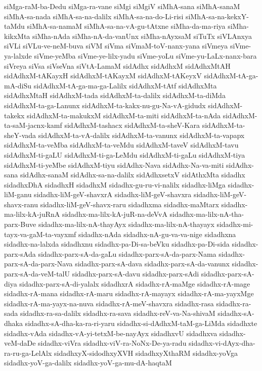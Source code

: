 {siMga-raM-ba-Dedu
siMga-ra-vane
siMgi
siMgiV
siMhA-sana
siMhA-sanaM
siMhA-sa-nada
siMhA-sa-na-dalilx
siMhA-sa-na-do-Li-risi
siMhA-sa-na-kekxY-taMdu
siMhA-sa-namaM
siMhA-sa-na-vA-gu-tAtxne
siMha-da-ma-riya
siMha-kikxMta
siMha-nAda
siMha-nA-da-vanUnx
siMha-nAyxsaM
siTuTx
siVLAnxya
siVLi
siVLu-ve-neM-buva
siVM
siVma
siVmaM-toV-nanx-yana
siVmeya
siVme-ya-lalxde
siVme-yeMba
siVme-ye-lilx-yadu
siVme-yoLu
siVme-yu-LaLx-nanx-bara
siVreya
siVsa
siVseVna
siVtA-LamaM
sidAdhx
sidAdhxM
sidAdhxMtAH
sidAdhxM-tAKayxH
sidAdhxM-tAKayxM
sidAdhxM-tAKeyxV
sidAdhxM-tA-ga-mA-diSu
sidAdhxM-tA-ga-ma-ga-Lalilx
sidAdhxM-tAtf
sidAdhxMta
sidAdhxMtaH
sidAdhxM-tada
sidAdhxM-ta-dalilx
sidAdhxM-ta-diMda
sidAdhxM-ta-ga-Lanunx
sidAdhxM-ta-kakx-nu-gu-Na-vA-gidudx
sidAdhxM-takekx
sidAdhxM-ta-makukxM
sidAdhxM-ta-miti
sidAdhxM-ta-nAda
sidAdhxM-ta-saM-jacnx-kamf
sidAdhxM-tashacx
sidAdhxM-ta-sheV-Kara
sidAdhxM-ta-sheY-vada
sidAdhxM-ta-vA-dalilx
sidAdhxM-ta-vanunx
sidAdhxM-ta-vapapx
sidAdhxM-ta-veMba
sidAdhxM-ta-veMdu
sidAdhxM-taveV
sidAdhxM-tavu
sidAdhxM-ti-gaLU
sidAdhxM-ti-ga-LeMdu
sidAdhxM-ti-gaLu
sidAdhxM-tiya
sidAdhxM-ti-yeMbe
sidAdhxM-tiyu
sidAdhx-Nava
sidAdhx-Na-va-miti
sidAdhx-sana
sidAdhx-sanaM
sidAdhx-sa-na-dalilx
sidAdhxsetxV
sidAthxMta
sidadhx
sidadhxDhA
sidadhxH
sidadhxM
sidadhx-gu-ru-vi-nalilx
sidadhx-liMga
sidadhx-liM-ganu
sidadhx-liM-geV-shavxrA
sidadhx-liM-geV-shavxra
sidadhx-liM-geV-shavx-ranu
sidadhx-liM-geV-shavx-raru
sidadhxma
sidadhx-maMtarx
sidadhx-ma-lilx-kA-juRnA
sidadhx-ma-lilx-kA-juR-na-deVvA
sidadhx-ma-lilx-nA-tha-parx-Buve
sidadhx-ma-lilx-nA-thayAyx
sidadhx-ma-lilx-nA-thayayx
sidadhx-mi-tayx-va-gaM-ta-vayxmf
sidadhx-nAda
sidadhx-nA-gu-va-va-nige
sidadhxna
sidadhx-na-lalxda
sidadhxnu
sidadhx-pa-Di-sa-beVku
sidadhx-pa-Di-sida
sidadhx-parx-sAda
sidadhx-parx-sA-da-gaLu
sidadhx-parx-sA-da-parx-Nama
sidadhx-parx-sA-da-parx-Nava
sidadhx-parx-sA-dava
sidadhx-parx-sA-da-vanunx
sidadhx-parx-sA-da-veM-talU
sidadhx-parx-sA-davu
sidadhx-parx-sAdi
sidadhx-parx-sA-diya
sidadhx-parx-sA-di-yalalx
sidadhxrA
sidadhx-rA-maMge
sidadhx-rA-mage
sidadhx-rA-mana
sidadhx-rA-maru
sidadhx-rA-mayayx
sidadhx-rA-ma-yayxMge
sidadhx-rA-ma-yayx-na-nuva
sidadhx-rA-meV-shavxra
sidadhx-rasa
sidadhx-ra-sada
sidadhx-ra-sa-dalilx
sidadhx-ra-sava
sidadhx-reV-va-Na-shivaM
sidadhx-sA-dhaka
sidadhx-sA-dha-ka-ra-ri-yaru
sidadhx-si-dAdhxM-taM-ga-LiMda
sidadhxte
sidadhx-vAda
sidadhx-vA-yi-tetxM-be-nayAyx
sidadhxvU
sidadhxva
sidadhx-veM-daDe
sidadhx-viVra
sidadhx-viV-ra-NoNx-De-ya-radu
sidadhx-vi-dAyx-dha-ra-ru-ga-LelAlx
sidadhxyX-sidodhxyXVH
sidadhxyXthaRM
sidadhx-yoVga
sidadhx-yoV-ga-dalilx
sidadhx-yoV-ga-mu-dA-haqtaM
}
